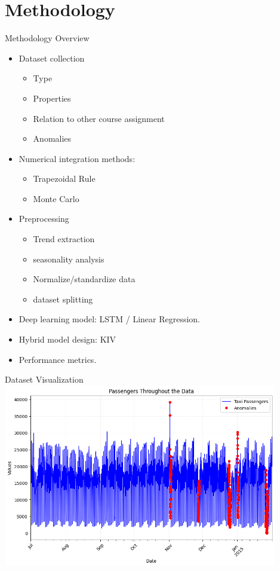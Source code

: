 \documentclass[10pt]{beamer}
\begin{document}
\section{Methodology}
\begin{frame}{Methodology Overview}
    \begin{itemize}
        \item Dataset collection
        \begin{itemize}
            \item Type
            \item Properties
            \item Relation to other course assignment
            \item Anomalies
        \end{itemize}
        \item Numerical integration methods: 
        \begin{itemize}
            \item Trapezoidal Rule
            \item Monte Carlo
        \end{itemize}
        \item Preprocessing
        \begin{itemize}
            \item Trend extraction
            \item seasonality analysis
            \item Normalize/standardize data
            \item dataset splitting
        \end{itemize}
            \item Deep learning model: LSTM / Linear Regression.
            \item Hybrid model design: KIV
            \item Performance metrics.
    \end{itemize}
\end{frame}
\begin{frame}{Dataset Visualization}
    \includegraphics[height=8cm]{Taxi-Passengers-Graph} %
\end{frame}
\end{document}
